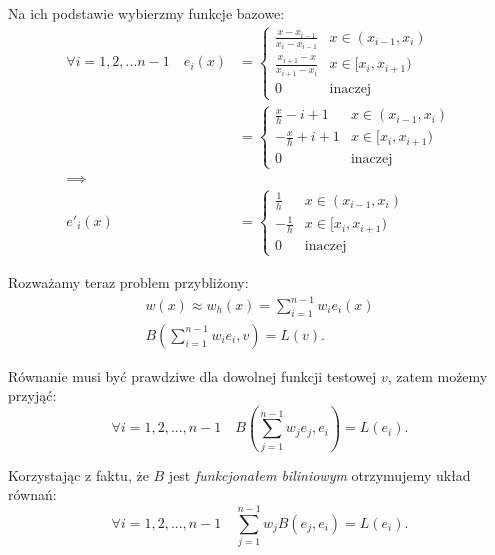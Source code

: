 \documentclass[11pt,a4paper]{article}
\begin{document}
Na ich podstawie wybierzmy funkcje bazowe:
\begin{equation}
    \begin{split}
        \forall i = 1, 2, ... n - 1 \quad e_i(x) &= 
        \begin{cases}
            \frac{x - x_{i - 1}}{x_i - x_{i - 1}} & x \in (x_{i - 1}, x_i) \\
            \frac{x_{i + 1} - x}{x_{i + 1} - x_i} & x \in [x_i, x_{i + 1}) \\
            0 & \text{inaczej}
        \end{cases}
        \\
        &= 
        \begin{cases}
            \frac{x}{h} - i + 1 & x \in (x_{i - 1}, x_i) \\
            -\frac{x}{h} + i + 1 & x \in [x_i, x_{i + 1}) \\
            0 & \text{inaczej}
        \end{cases}
        \\
        \implies
        \\
        e'_i(x) &= 
        \begin{cases}
            \frac{1}{h} & x \in (x_{i - 1}, x_i) \\
            -\frac{1}{h} & x \in [x_i, x_{i + 1}) \\
            0 & \text{inaczej}
        \end{cases}
    \end{split}
\end{equation}

Rozważamy teraz problem przybliżony:
\begin{equation}
    \begin{split}
        w(x) \approx w_h(x) = \sum_{i = 1}^{n - 1} w_i e_i(x)
        \\
        B(\sum_{i = 1}^{n - 1} w_i e_i, v) = L(v).
    \end{split}
\end{equation}

Równanie musi być prawdziwe dla dowolnej funkcji testowej $v$,
zatem możemy przyjąć:
\begin{equation}
    \forall i = 1, 2, ..., n - 1 \quad B(\sum_{j = 1}^{n - 1} w_j e_j, e_i) = L(e_i).
\end{equation}

Korzystając z faktu, że $B$ jest \textit{funkcjonałem biliniowym} otrzymujemy układ równań:
\begin{equation}
    \forall i = 1, 2, ..., n - 1 \quad \sum_{j = 1}^{n - 1} w_j B(e_j, e_i) = L(e_i).
\end{equation}
\end{document}
